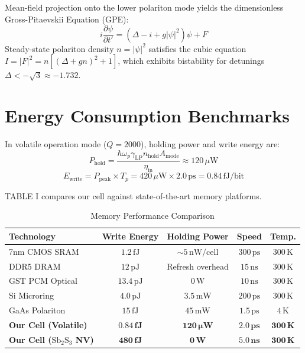 \documentclass[10pt, conference]{IEEEtran}
\begin{document}
Mean-field projection onto the lower polariton mode yields the dimensionless Gross-Pitaevskii Equation (GPE):
\begin{equation}
i \frac{\partial \psi}{\partial t'} = \left(\Delta - i + g |\psi|^2\right) \psi + F
\end{equation}
Steady-state polariton density $n = |\psi|^2$ satisfies the cubic equation $I = |F|^2 = n[(\Delta + gn)^2 + 1]$, which exhibits bistability for detunings $\Delta < -\sqrt{3} \approx -1.732$.

\section{Energy Consumption Benchmarks}

In volatile operation mode ($Q = 2000$), holding power and write energy are:
\begin{equation}
P_{\text{hold}} = \frac{\hbar \omega_p \gamma_{\text{LP}} n_{\text{hold}} A_{\text{mode}}}{\eta_{\text{in}}} \approx 120\,\mu\text{W}
\end{equation}
\begin{equation}
E_{\text{write}} = P_{\text{peak}} \times T_p = 420\,\mu\text{W} \times 2.0\,\text{ps} = 0.84\,\text{fJ/bit}
\end{equation}

TABLE I compares our cell against state-of-the-art memory platforms.

\begin{table}[htbp]
\caption{Memory Performance Comparison}
\centering
\begin{tabular}{lcccc}
\toprule
\textbf{Technology} & \textbf{Write Energy} & \textbf{Holding Power} & \textbf{Speed} & \textbf{Temp.} \\
\midrule
7nm CMOS SRAM & $1.2\,\text{fJ}$ & $\sim 5\,\text{nW/cell}$ & $300\,\text{ps}$ & $300\,\text{K}$ \\
DDR5 DRAM & $12\,\text{pJ}$ & Refresh overhead & $15\,\text{ns}$ & $300\,\text{K}$ \\
GST PCM Optical & $13.4\,\text{pJ}$ & $0\,\text{W}$ & $10\,\text{ns}$ & $300\,\text{K}$ \\
Si Microring & $4.0\,\text{pJ}$ & $3.5\,\text{mW}$ & $200\,\text{ps}$ & $300\,\text{K}$ \\
GaAs Polariton & $15\,\text{fJ}$ & $45\,\text{mW}$ & $1.5\,\text{ps}$ & $4\,\text{K}$ \\
\textbf{Our Cell (Volatile)} & $\mathbf{0.84\,\text{fJ}}$ & $\mathbf{120\,\mu\text{W}}$ & $\mathbf{2.0\,\text{ps}}$ & $\mathbf{300\,\text{K}}$ \\
\textbf{Our Cell ($\text{Sb}_2\text{S}_3$ NV)} & $\mathbf{480\,\text{fJ}}$ & $\mathbf{0\,\text{W}}$ & $\mathbf{5.0\,\text{ns}}$ & $\mathbf{300\,\text{K}}$ \\
\bottomrule
\end{tabular}
\end{table}
\end{document}
